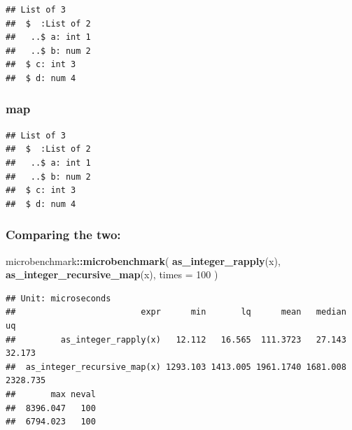 \documentclass[]{book}
\newenvironment{Shaded}{\begin{snugshade}}{\end{snugshade}}
\newcommand{\ControlFlowTok}[1]{\textcolor[rgb]{0.13,0.29,0.53}{\textbf{#1}}}
\newcommand{\DataTypeTok}[1]{\textcolor[rgb]{0.13,0.29,0.53}{#1}}
\newcommand{\DecValTok}[1]{\textcolor[rgb]{0.00,0.00,0.81}{#1}}
\newcommand{\KeywordTok}[1]{\textcolor[rgb]{0.13,0.29,0.53}{\textbf{#1}}}
\newcommand{\NormalTok}[1]{#1}
\newcommand{\OperatorTok}[1]{\textcolor[rgb]{0.81,0.36,0.00}{\textbf{#1}}}
\newcommand{\StringTok}[1]{\textcolor[rgb]{0.31,0.60,0.02}{#1}}
\begin{document}
\begin{verbatim}
## List of 3
##  $  :List of 2
##   ..$ a: int 1
##   ..$ b: num 2
##  $ c: int 3
##  $ d: num 4
\end{verbatim}

\hypertarget{map}{%
\subsubsection{map}\label{map}}

\begin{Shaded}
\end{Shaded}

\begin{verbatim}
## List of 3
##  $  :List of 2
##   ..$ a: int 1
##   ..$ b: num 2
##  $ c: int 3
##  $ d: num 4
\end{verbatim}

\hypertarget{comparing-the-two}{%
\subsubsection{Comparing the two:}\label{comparing-the-two}}

\begin{Shaded}
\begin{Highlighting}[]
\NormalTok{microbenchmark}\OperatorTok{::}\KeywordTok{microbenchmark}\NormalTok{(}
  \KeywordTok{as_integer_rapply}\NormalTok{(x),}
  \KeywordTok{as_integer_recursive_map}\NormalTok{(x),}
  \DataTypeTok{times =} \DecValTok{100}
\NormalTok{)}
\end{Highlighting}
\end{Shaded}

\begin{verbatim}
## Unit: microseconds
##                         expr      min       lq      mean   median       uq
##         as_integer_rapply(x)   12.112   16.565  111.3723   27.143   32.173
##  as_integer_recursive_map(x) 1293.103 1413.005 1961.1740 1681.008 2328.735
##       max neval
##  8396.047   100
##  6794.023   100
\end{verbatim}
\end{document}
